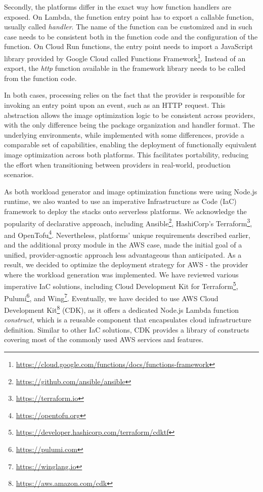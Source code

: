 Secondly, the platforms differ in the exact way how function handlers are exposed. On Lambda, the function entry point has to export a callable function, usually called \emph{handler}. The name of the function can be customized and in such case needs to be consistent both in the function code and the configuration of the function. On Cloud Run functions, the entry point needs to import a JavaScript library provided by Google Cloud called Functions Framework\footnote{\url{https://cloud.google.com/functions/docs/functions-framework}}. Instead of an export, the \emph{http} function available in the framework library needs to be called from the function code.

In both cases, processing relies on the fact that the provider is responsible for invoking an entry point upon an event, such as an HTTP request. This abstraction allows the image optimization logic to be consistent across providers, with the only difference being the package organization and handler format. The underlying environments, while implemented with some differences, provide a comparable set of capabilities, enabling the deployment of functionally equivalent image optimization across both platforms. This facilitates portability, reducing the effort when transitioning between providers in real-world, production scenarios.

As both workload generator and image optimization functions were using Node.js runtime, we also wanted to use an imperative Infrastructure as Code (IaC) framework to deploy the stacks onto serverless platforms. We acknowledge the popularity of declarative approach, including Ansible\footnote{\url{https://github.com/ansible/ansible}}, HashiCorp's Terraform\footnote{\url{https://terraform.io}}, and OpenTofu\footnote{\url{https://opentofu.org}}. Nevertheless, platforms' unique requirements described earlier, and the additional proxy module in the AWS case, made the initial goal of a unified, provider-agnostic approach less advantageous than anticipated. As a result, we decided to optimize the deployment strategy for AWS - the provider where the workload generation was implemented. We have reviewed various imperative IaC solutions, including Cloud Development Kit for Terraform\footnote{\url{https://developer.hashicorp.com/terraform/cdktf}}, Pulumi\footnote{\url{https://pulumi.com}}, and Wing\footnote{\url{https://winglang.io}}. Eventually, we have decided to use AWS Cloud Development Kit\footnote{\url{https://aws.amazon.com/cdk}} (CDK), as it offers a dedicated Node.js Lambda function \emph{construct}, which is a reusable component that encapsulates cloud infrastructure definition. Similar to other IaC solutions, CDK provides a library of constructs covering most of the commonly used AWS services and features.

